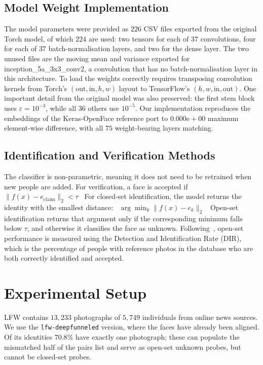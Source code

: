 \documentclass[conference]{IEEEtran}
\begin{document}
\subsection{Model Weight Implementation}

The model parameters were provided as $226$ CSV files exported from the original Torch model, of which $224$ are used: two tensors for each of $37$ convolutions, four for each of $37$
batch-normalisation layers, and two for the dense layer. The two unused files are
the moving mean and variance exported for inception\_5a\_3x3\_conv2, a
convolution that has no batch-normalisation layer in this architecture. To load the weights correctly requires
transposing convolution kernels from Torch's $(\text{out},\text{in},h,w)$ layout to
TensorFlow's $(h,w,\text{in},\text{out})$. One important detail from the original model was also preserved:
the first stem block uses $\varepsilon=10^{-3}$, while all $36$ others use
$10^{-5}$. Our implementation reproduces the embeddings of the Keras-OpenFace
reference port to $0.000\mathrm{e}{+}00$ maximum element-wise difference, with all
$75$ weight-bearing layers matching.

\subsection{Identification and Verification Methods}

The classifier is non-parametric, meaning it does not need to be retrained when new people are added. For verification, a face is accepted if
\
$\lVert f(x)-e_{\text{claim}}\rVert_2 < \tau$
\
For closed-set identification, the model returns the identity with the smallest distance:
\
$\arg\min_k \lVert f(x)-e_k\rVert_2$
\
Open-set identification returns that
argument only if the corresponding minimum falls below $\tau$, and otherwise
it classifies the face as unknown. Following~\cite{klare2015ijba}, open-set performance is measured using the Detection and Identification Rate (DIR), which is the percentage of people with reference photos in the database who are both correctly identified and accepted.

\section{Experimental Setup}

LFW contains $13{,}233$ photographs of $5{,}749$ individuals from online news
sources. We use the \texttt{lfw-deepfunneled} version, where the faces have already been aligned. Of its
identities $70.8\%$ have exactly one photograph; these can populate the mismatched
half of the pairs list and serve as open-set unknown probes, but cannot be
closed-set probes.
\end{document}
